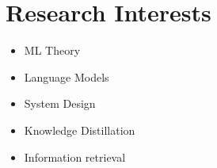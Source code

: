 	
\section{Research Interests}

\begin{multicols}{4}[\setlength{\columnsep}{30pt}]
	\small
	\begin{itemize}
		\item ML Theory
		\item Language Models
		\item System Design
		\item Knowledge Distillation 
		\item Information retrieval
	\end{itemize}
\end{multicols}